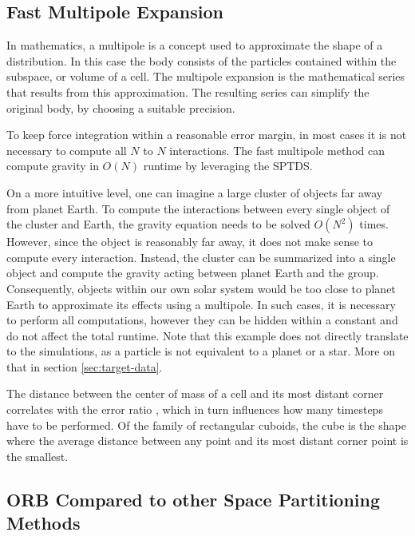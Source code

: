 \documentclass[]{article}
\begin{document}
\subsection{Fast Multipole Expansion} \label{sec:multipole}

In mathematics, a multipole is a concept used to approximate the shape of a distribution. In this case the body consists of the particles contained within the subspace, or volume of a cell. The multipole expansion is the mathematical series that results from this approximation. The resulting series can simplify the original body, by choosing a suitable precision.

To keep force integration within a reasonable error margin, in most cases it is not necessary to compute all $N$ to $N$ interactions. The fast multipole method can compute gravity in $O(N)$ runtime by leveraging the SPTDS. \cite{Stadel2001}

On a more intuitive level, one can imagine a large cluster of objects far away from planet Earth. To compute the interactions between every single object of the cluster and Earth, the gravity equation needs to be solved $O(N^2)$ times. However, since the object is reasonably far away, it does not make sense to compute every interaction. Instead, the cluster can be summarized into a single object and compute the gravity acting between planet Earth and the group. Consequently, objects within our own solar system would be too close to planet Earth to approximate its effects using a multipole. In such cases, it is necessary to perform all computations, however they can be hidden within a constant and do not affect the total runtime. 
Note that this example does not directly translate to the simulations, as a particle is not equivalent to a planet or a star. More on that in section \ref{sec:target-data}.

The distance between the center of mass of a cell and its most distant corner correlates with the error ratio \cite{Stadel2001}, which in turn influences how many timesteps have to be performed. Of the family of rectangular cuboids, the cube is the shape where the average distance between any point and its most distant corner point is the smallest. 

\subsection{ORB Compared to other Space Partitioning Methods}
\end{document}

